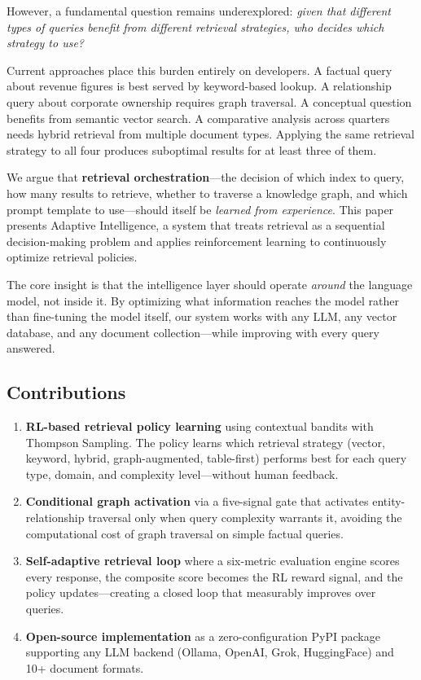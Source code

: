 \documentclass[11pt]{article}
\begin{document}
However, a fundamental question remains underexplored: \textit{given that different types of queries benefit from different retrieval strategies, who decides which strategy to use?}

Current approaches place this burden entirely on developers. A factual query about revenue figures is best served by keyword-based lookup. A relationship query about corporate ownership requires graph traversal. A conceptual question benefits from semantic vector search. A comparative analysis across quarters needs hybrid retrieval from multiple document types. Applying the same retrieval strategy to all four produces suboptimal results for at least three of them.

We argue that \textbf{retrieval orchestration}---the decision of which index to query, how many results to retrieve, whether to traverse a knowledge graph, and which prompt template to use---should itself be \textit{learned from experience}. This paper presents Adaptive Intelligence, a system that treats retrieval as a sequential decision-making problem and applies reinforcement learning to continuously optimize retrieval policies.

The core insight is that the intelligence layer should operate \textit{around} the language model, not inside it. By optimizing what information reaches the model rather than fine-tuning the model itself, our system works with any LLM, any vector database, and any document collection---while improving with every query answered.

\subsection{Contributions}

\begin{enumerate}
    \item \textbf{RL-based retrieval policy learning} using contextual bandits with Thompson Sampling. The policy learns which retrieval strategy (vector, keyword, hybrid, graph-augmented, table-first) performs best for each query type, domain, and complexity level---without human feedback.
    
    \item \textbf{Conditional graph activation} via a five-signal gate that activates entity-relationship traversal only when query complexity warrants it, avoiding the computational cost of graph traversal on simple factual queries.
    
    \item \textbf{Self-adaptive retrieval loop} where a six-metric evaluation engine scores every response, the composite score becomes the RL reward signal, and the policy updates---creating a closed loop that measurably improves over queries.
    
    \item \textbf{Open-source implementation} as a zero-configuration PyPI package supporting any LLM backend (Ollama, OpenAI, Grok, HuggingFace) and 10+ document formats.
\end{enumerate}
\end{document}
